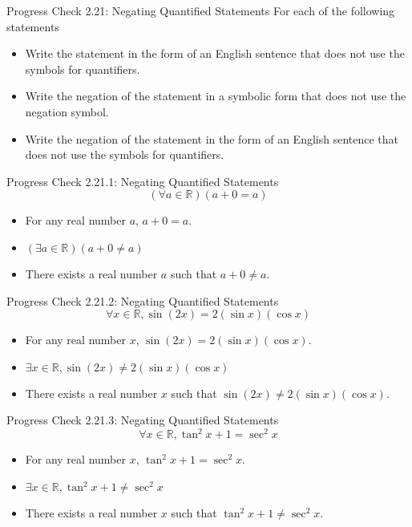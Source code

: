 \documentclass{beamer}
\begin{document}
\begin{frame}{Progress Check 2.21: Negating Quantified Statements}
	For each of the following statements
	\begin{itemize}
		\item Write the statement in the form of an English sentence that does not use the symbols for quantifiers.
		\item Write the negation of the statement in a symbolic form that does not use the negation symbol.
		\item Write the negation of the statement in the form of an English sentence that does not use the symbols for quantifiers.
	\end{itemize}
\end{frame}

\begin{frame}{Progress Check 2.21.1: Negating Quantified Statements}
	\[(\forall a \in \mathbb{R})(a + 0 = a)\]
	\pause
	\begin{itemize}
		\item For any real number $a$, $a + 0 = a$.\pause
		\item \((\exists a \in \mathbb{R})(a + 0 \neq a)\) \pause
		\item There exists a real number $a$ such that $a + 0 \neq a$.
	\end{itemize}
\end{frame}

\begin{frame}{Progress Check 2.21.2: Negating Quantified Statements}
	\[\forall x \in \mathbb{R}, \sin(2x) = 2(\sin x)(\cos x)\]
	\pause
	\begin{itemize}
		\item For any real number $x$, $\sin(2x) = 2(\sin x)(\cos x)$.\pause
		\item \(\exists x \in \mathbb{R}, \sin(2x) \neq 2(\sin x)(\cos x)\) \pause
		\item There exists a real number $x$ such that $\sin(2x) \neq 2(\sin x)(\cos x)$.
	\end{itemize}
\end{frame}

\begin{frame}{Progress Check 2.21.3: Negating Quantified Statements}
	\[\forall x \in \mathbb{R}, \tan^2 x + 1 = \sec^2 x\]
	\pause
	\begin{itemize}
		\item For any real number $x$, $\tan^2 x + 1 = \sec^2 x$.\pause
		\item \(\exists x \in \mathbb{R}, \tan^2 x + 1 \neq \sec^2 x\) \pause
		\item There exists a real number $x$ such that $\tan^2 x + 1 \neq \sec^2 x$.
	\end{itemize}
\end{frame}
\end{document}

